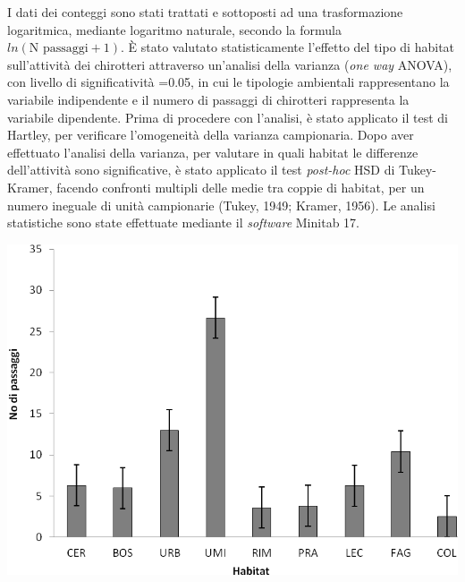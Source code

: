 \begin{multicols}{2}
I dati dei conteggi sono stati trattati e sottoposti ad una trasformazione logaritmica, mediante logaritmo naturale, secondo la formula $ln(\text{N passaggi} + 1)$. È stato valutato statisticamente l’effetto del tipo di habitat sull’attività dei chirotteri attraverso un’analisi della varianza (\textit{one way} ANOVA), con livello di significatività \prob{}=0.05, in cui le tipologie ambientali rappresentano la variabile indipendente e il numero di passaggi di chirotteri rappresenta la variabile dipendente. Prima di procedere con l’analisi, è stato applicato il test di Hartley, per verificare l’omogeneità della varianza campionaria. Dopo aver effettuato l’analisi della varianza, per valutare in quali habitat le differenze dell’attività sono significative, è stato applicato il test \textit{post-hoc} HSD di Tukey-Kramer, facendo confronti multipli delle medie tra coppie di habitat, per un numero ineguale di unità campionarie (Tukey, 1949; Kramer, 1956). Le analisi statistiche sono state effettuate mediante il \textit{software} Minitab 17.

\begin{Figure} %
  \centering\small
  \includegraphics[width=\linewidth]{abstracts/extended_abstracts/P001_Figure1.png}
\end{Figure}


\end{multicols}
